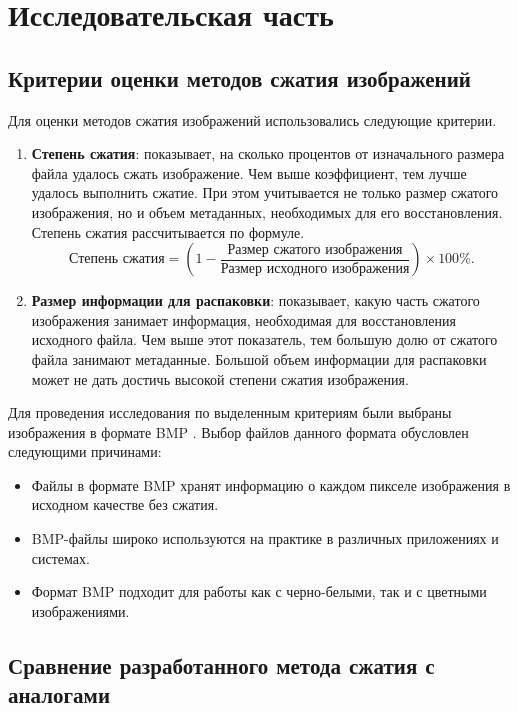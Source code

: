 
\chapter{Исследовательская часть}

\section{Критерии оценки методов сжатия изображений}

Для оценки методов сжатия изображений использовались следующие критерии.
\begin{enumerate}
    \item \textbf{Степень сжатия}: показывает, на сколько процентов от изначального размера файла удалось сжать изображение. Чем выше коэффициент, тем лучше удалось выполнить сжатие. При этом учитывается не только размер сжатого изображения, но и объем метаданных, необходимых для его восстановления. Степень сжатия рассчитывается по формуле.
    \begin{equation}
        \text{Степень сжатия} = \left(1 - \frac{\text{Размер сжатого изображения}}{\text{Размер исходного изображения}}\right) \times 100\%.
    \end{equation}
    \item \textbf{Размер информации для распаковки}: показывает, какую часть сжатого изображения занимает информация, необходимая для восстановления исходного файла. Чем выше этот показатель, тем большую долю от сжатого файла занимают метаданные. Большой объем информации для распаковки может не дать достичь высокой степени сжатия изображения.
\end{enumerate}

Для проведения исследования по выделенным критериям были выбраны изображения в формате BMP \cite{article-bmp}. Выбор файлов данного формата обусловлен следующими причинами:
\begin{itemize}
    \item Файлы в формате BMP хранят информацию о каждом пикселе изображения в исходном качестве без сжатия.
    \item BMP-файлы широко используются на практике в различных приложениях и системах.
    \item Формат BMP подходит для работы как с черно-белыми, так и с цветными изображениями.
\end{itemize}

\section{Сравнение разработанного метода сжатия с \mbox{аналогами}}

